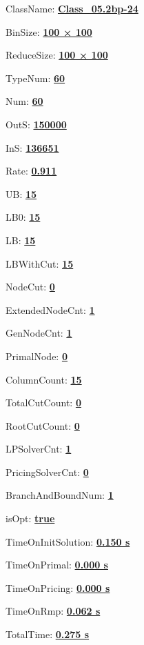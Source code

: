 \documentclass[11pt]{article}
\begin{document}
\pagestyle{empty}


ClassName: \underline{\textbf{Class_05.2bp-24}}
\par
BinSize: \underline{\textbf{100 × 100}}
\par
ReduceSize: \underline{\textbf{100 × 100}}
\par
TypeNum: \underline{\textbf{60}}
\par
Num: \underline{\textbf{60}}
\par
OutS: \underline{\textbf{150000}}
\par
InS: \underline{\textbf{136651}}
\par
Rate: \underline{\textbf{0.911}}
\par
UB: \underline{\textbf{15}}
\par
LB0: \underline{\textbf{15}}
\par
LB: \underline{\textbf{15}}
\par
LBWithCut: \underline{\textbf{15}}
\par
NodeCut: \underline{\textbf{0}}
\par
ExtendedNodeCnt: \underline{\textbf{1}}
\par
GenNodeCnt: \underline{\textbf{1}}
\par
PrimalNode: \underline{\textbf{0}}
\par
ColumnCount: \underline{\textbf{15}}
\par
TotalCutCount: \underline{\textbf{0}}
\par
RootCutCount: \underline{\textbf{0}}
\par
LPSolverCnt: \underline{\textbf{1}}
\par
PricingSolverCnt: \underline{\textbf{0}}
\par
BranchAndBoundNum: \underline{\textbf{1}}
\par
isOpt: \underline{\textbf{true}}
\par
TimeOnInitSolution: \underline{\textbf{0.150 s}}
\par
TimeOnPrimal: \underline{\textbf{0.000 s}}
\par
TimeOnPricing: \underline{\textbf{0.000 s}}
\par
TimeOnRmp: \underline{\textbf{0.062 s}}
\par
TotalTime: \underline{\textbf{0.275 s}}
\par
\newpage


\end{document}
